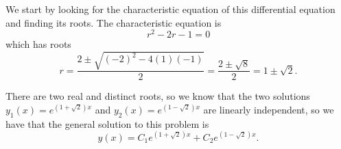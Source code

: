 \begin{exampleSol}
We start by looking for the characteristic equation of this differential equation and finding its roots. The characteristic equation is
\begin{equation*}
r^2 - 2r - 1 = 0
\end{equation*} which has roots
\begin{equation*}
r = \frac{2 \pm \sqrt{(-2)^2 - 4(1)(-1)}}{2} = \frac{2 \pm \sqrt{8}}{2} = 1 \pm \sqrt{2}.
\end{equation*}

There are two real and distinct roots, so we know that the two solutions $y_1(x) = e^{(1+\sqrt{2})x}$ and $y_2(x) = e^{(1-\sqrt{2})x}$ are linearly independent, so we have that the general solution to this problem is
\begin{equation*}
y(x) = C_1e^{(1+\sqrt{2})x} + C_2e^{(1 - \sqrt{2})x}.
\end{equation*}


\end{exampleSol}
